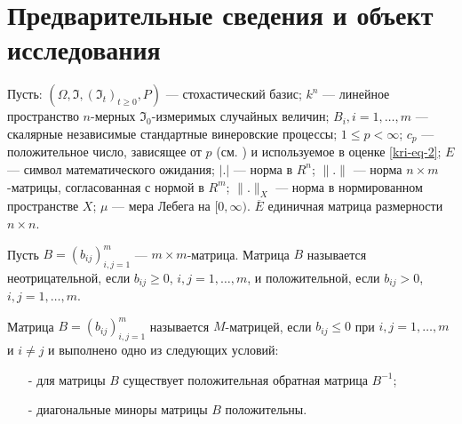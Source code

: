 
\section{Предварительные сведения и объект исследования}

Пусть:  $(\Omega, \Im, (\Im_t)_{t \ge 0}, P)$ --- стохастический базис;  $k^n$ --- линейное пространство  $n$-мерных $\Im_0$-измеримых случайных величин;  $B_i, i=1, \dots, m$ --- скалярные независимые стандартные винеровские процессы; $1 \le p < \infty$;  $c_p$ --- положительное число, зависящее от $p$ (см. \cite[с. 65]{kri-bib-17}) и используемое в оценке \eqref{kri-eq-2}; $E$ --- символ математического ожидания; $|.|$ --- норма в $R^n$; $\|.\|$ --- норма $n \times m$-матрицы, согласованная с нормой в $R^m$; $\|.\|_X$ --- норма в нормированном пространстве  $X$; $\mu$ --- мера Лебега на $[0, \infty )$.
$\overline E$ единичная матрица размерности  $n\times n$.

Пусть $B=(b_{ij})_{i,j=1}^m$ --- $m\times m$-матрица.
Матрица  $B$ называется неотрицательной, если  $b_{ij} \ge 0$, $i,j=1, \dots ,m$, и положительной, если $b_{ij} > 0$, $i, j=1, \dots, m$.

\begin{definition}
\cite{kri-bib-18} Матрица  $B=(b_{ij})_{i,j=1}^m$ называется $M$-матрицей, если $b_{ij}\le 0$ при  $i,j=1,\dots,m$ и $i\neq j$ и выполнено одно из следующих условий:

\begin{itemize}
	\item[-]
	для матрицы  $B$ существует положительная обратная матрица $B^{-1}$;
	
	\item[-]
	диагональные миноры матрицы  $B$ положительны.
\end{itemize}
\end{definition}

